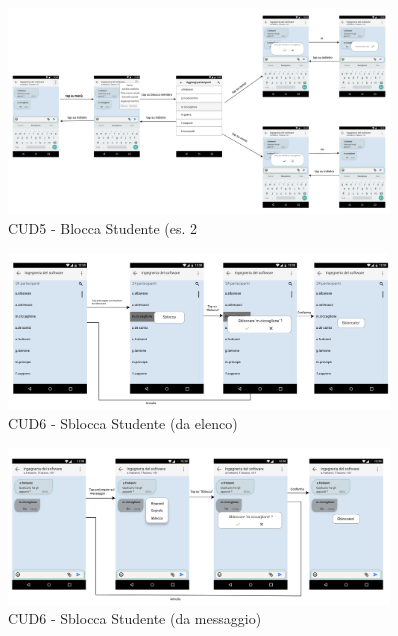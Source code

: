 \begin{figure}
	\centering
	\includegraphics[width=0.9\textwidth]{imgs/gruppo6/activities/act_cud5_blocca_studente2.pdf}
	\caption{CUD5 - Blocca Studente (es. 2}
	\label{fig:act-cud5-2}
\end{figure}

\begin{figure}
	\centering
	\includegraphics[width=0.9\textwidth]{imgs/gruppo6/activities/act_cud6_sblocca_da_elenco.pdf}
	\caption{CUD6 - Sblocca Studente (da elenco)}
	\label{fig:act-cud6}
\end{figure}

\begin{figure}
	\centering
	\includegraphics[width=0.9\textwidth]{imgs/gruppo6/activities/act_cud6_sblocca_da_messaggio.pdf}
	\caption{CUD6 - Sblocca Studente (da messaggio)}
	\label{fig:act-cud6-2}
\end{figure}

